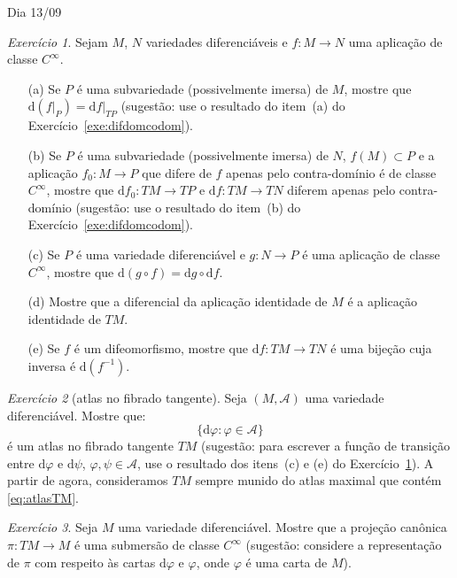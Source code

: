 \documentclass[oneside,11pt]{amsart}
\newcommand{\dd}{\mathrm d}
\theoremstyle{remark}\newtheorem{exercise}{Exercício}[section]
\theoremstyle{plain}\newtheorem{teo}{Teorema}[section]
\theoremstyle{plain}\newtheorem{lem}[teo]{Lema}
\theoremstyle{plain}\newtheorem{prop}[teo]{Proposição}
\theoremstyle{definition}\newtheorem{defin}[teo]{Definição}
\theoremstyle{remark}\newtheorem{rem}[teo]{Observação}
\theoremstyle{definition}\newtheorem{example}[teo]{Exemplo}
\numberwithin{equation}{section}
\begin{document}
\begin{section}{Dia 13/09}
\begin{exercise}\label{exe:basicodf}
Sejam $M$, $N$ variedades diferenciáveis e $f:M\to N$ uma aplicação de classe $C^\infty$.
\begin{itemize}
\item[(a)] Se $P$ é uma subvariedade (possivelmente imersa) de $M$, mostre que $\dd(f\vert_P)=\dd f\vert_{TP}$ (sugestão: use o resultado
do item~(a) do Exercício~\ref{exe:difdomcodom}).
\item[(b)] Se $P$ é uma subvariedade (possivelmente imersa) de $N$, $f(M)\subset P$ e a aplicação $f_0:M\to P$ que difere de $f$ apenas pelo contra-domínio
é de classe $C^\infty$, mostre que $\dd f_0:TM\to TP$ e $\dd f:TM\to TN$ diferem apenas pelo contra-domínio (sugestão: use o resultado
do item~(b) do Exercício~\ref{exe:difdomcodom}).
\item[(c)] Se $P$ é uma variedade diferenciável e $g:N\to P$ é uma aplicação de classe $C^\infty$, mostre que $\dd(g\circ f)=\dd g\circ\dd f$.
\item[(d)] Mostre que a diferencial da aplicação identidade de $M$ é a aplicação identidade de $TM$.
\item[(e)] Se $f$ é um difeomorfismo, mostre que $\dd f:TM\to TN$ é uma bijeção cuja inversa é $\dd(f^{-1})$.
\end{itemize}
\end{exercise}

\begin{exercise}[atlas no fibrado tangente]\label{exe:fibradotangente}
Seja $(M,\mathcal A)$ uma variedade diferenciável. Mostre que:
\begin{equation}\label{eq:atlasTM}
\big\{\dd\varphi:\varphi\in\mathcal A\big\}
\end{equation}
é um atlas no fibrado tangente $TM$ (sugestão: para escrever a função de transição entre $\dd\varphi$ e $\dd\psi$, $\varphi,\psi\in\mathcal A$,
use o resultado dos itens~(c) e (e) do Exercício~\ref{exe:basicodf}).
A partir de agora, consideramos $TM$ sempre munido do atlas maximal que contém \eqref{eq:atlasTM}.
\end{exercise}

\begin{exercise}
Seja $M$ uma variedade diferenciável. Mostre que a projeção canônica $\pi:TM\to M$
é uma submersão de classe $C^\infty$ (sugestão: considere a representação de $\pi$ com respeito às cartas $\dd\varphi$ e $\varphi$,
onde $\varphi$ é uma carta de $M$).
\end{exercise}


\end{section}
\end{document}
